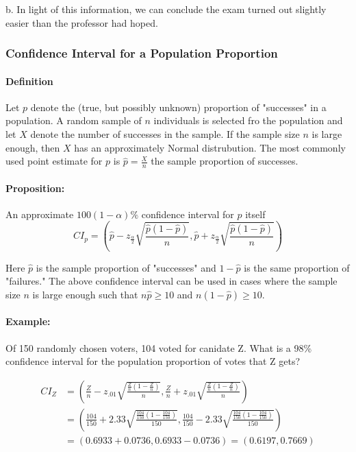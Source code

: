 b. In light of this information, we can conclude the exam turned out slightly easier than the professor had hoped.

\subsubsection*{Confidence Interval for a Population Proportion}
\paragraph*{Definition}
Let $p$ denote the (true, but possibly unknown) proportion of "successes" in a population. A random sample of $n$ 
individuals is selected fro the population and let $X$ denote the number of successes in the sample.
If the sample size $n$ is large enough, then $X$ has an approximately Normal distrubution. 
The most commonly used point estimate for $p$ is $\hat{p} = \frac{X}{n}$ the sample proportion of successes.

\paragraph*{Proposition:}
An approximate $100(1-\alpha)\%$ confidence interval for $p$ itself
\[
    CI_p = (\hat{p} - z_\frac{\alpha}{2} \sqrt{\frac{\hat{p}(1-\hat{p})}{n}}, \hat{p} + z_\frac{\alpha}{2} \sqrt{\frac{\hat{p}(1-\hat{p})}{n}})
\]

Here $\hat{p}$ is the sample proportion of "successes" and $1-\hat{p}$ is the same proportion of "failures."
The above confidence interval can be used in cases where the sample size $n$ is large enough such that 
$n\hat{p} \geq 10$ and $n(1-\hat{p}) \geq 10$.

\paragraph*{Example:}
Of 150 randomly chosen voters, 104 voted for canidate Z. What is a 98\% confidence interval for the 
population proportion of votes that Z gets?

\begin{align*}
    CI_Z &= (\frac{Z}{n} - z_{.01}\sqrt{\frac{\frac{Z}{n}(1-\frac{Z}{n})}{n}}, \frac{Z}{n} + z_{.01}\sqrt{\frac{\frac{Z}{n}(1-\frac{Z}{n})}{n}})\\
    &= (\frac{104}{150} + 2.33 \sqrt{\frac{\frac{104}{150}(1-\frac{104}{150})}{150}}, \frac{104}{150} - 2.33 \sqrt{\frac{\frac{104}{150}(1-\frac{104}{150})}{150}})\\
    &= (0.6933 + 0.0736, 0.6933 - 0.0736) = (0.6197, 0.7669)
\end{align*}

